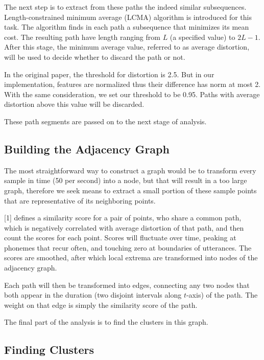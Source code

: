 \documentclass{article}
\begin{document}
        The next step is to extract from these paths the indeed similar subsequences. Length-constrained minimum
        average (LCMA) algorithm is introduced for this task. The algorithm finds in each path a subsequence
        that minimizes its mean cost. The resulting path have length ranging from $L$ (a specified value) to 
        $2L-1$. After this stage, the minimum average value, referred to as average distortion, will be used
        to decide whether to discard the path or not.

        In the original paper, the threshold for distortion is 2.5. But in our implementation, features are 
        normalized thus their difference has norm at most 2. With the same consideration, we set our 
        threshold to be 0.95. Paths with average distortion above this value will be discarded.

        These path segments are passed on to the next stage of analysis.

    \subsection{Building the Adjacency Graph}
        The most straightforward way to construct a graph would be to transform every sample in time (50 per 
        second) into a node, but that will result in a too large graph, therefore we seek means to extract 
        a small portion of these sample points that are representative of its neighboring points.

        [1] defines a similarity score for a pair of points, who share a common path, which is negatively 
        correlated with average distortion of that path, and then count the scores for each point. Scores
        will fluctuate over time, peaking at phonemes that recur often, and touching zero at boundaries of 
        utterances. The scores are smoothed, after which local extrema are transformed into nodes of 
        the adjacency graph.

        Each path will then be transformed into edges, connecting any two nodes that both appear in the
        duration (two disjoint intervals along $t$-axis) of the path. The weight on that edge is simply the 
        similarity score of the path.

        The final part of the analysis is to find the clusters in this graph.

    \subsection{Finding Clusters}
\end{document}
